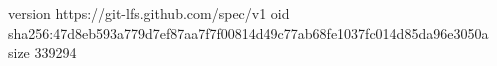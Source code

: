 version https://git-lfs.github.com/spec/v1
oid sha256:47d8eb593a779d7ef87aa7f7f00814d49c77ab68fe1037fc014d85da96e3050a
size 339294
